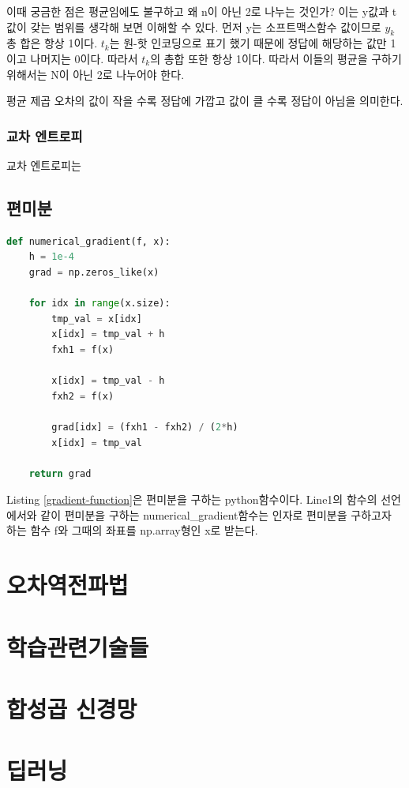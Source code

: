 \documentclass[12pt]{article}
\begin{document}
이때 궁금한 점은 평균임에도 불구하고 왜 n이 아닌 2로 나누는 것인가? 이는 y값과 t값이 갖는 범위를 생각해 보면 이해할 수 있다. 먼저 y는 소프트맥스함수 값이므로 $y_{k}$ 총 합은 항상 1이다.
$t_{k}$는 원-핫 인코딩으로 표기 했기 때문에 정답에 해당하는 값만 1이고 나머지는 0이다. 따라서 $t_{k}$의 총합 또한 항상 1이다. 따라서 이들의 평균을 구하기 위해서는 N이 아닌 2로 나누어야 한다.

평균 제곱 오차의 값이 작을 수록 정답에 가깝고 값이 클 수록 정답이 아님을 의미한다.
	\subsubsection{교차 엔트로피}
	교차 엔트로피는 

\subsection{ 편미분}
\begin{lstlisting}[language=Python, caption={Python으로 구현한 편미분 함수},label=gradient-function]
def numerical_gradient(f, x):
	h = 1e-4
	grad = np.zeros_like(x)

	for idx in range(x.size):
		tmp_val = x[idx]
		x[idx] = tmp_val + h
		fxh1 = f(x)

		x[idx] = tmp_val - h
		fxh2 = f(x)

		grad[idx] = (fxh1 - fxh2) / (2*h)
		x[idx] = tmp_val

	return grad
\end{lstlisting}

Listing \ref{gradient-function}은 편미분을 구하는 python함수이다. Line1의 함수의 선언에서와 같이 편미분을 구하는 numerical\_gradient함수는 인자로 편미분을 구하고자 하는 함수 f와 그때의 좌표를 np.array형인 x로 받는다.

\clearpage
\section{오차역전파법}

\clearpage
\section{학습관련기술들}

\clearpage
\section{합성곱 신경망}

\clearpage
\section{딥러닝}
\end{document}
